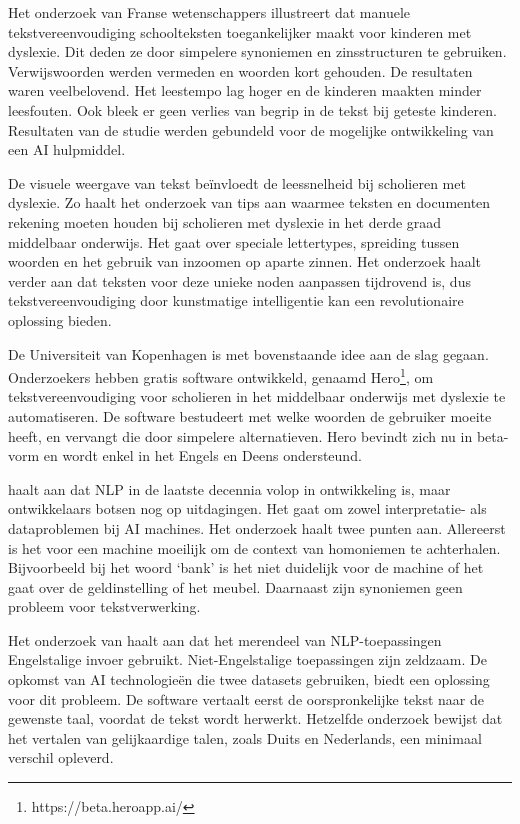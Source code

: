 Het onderzoek van Franse wetenschappers \newline \textcite{Gala2016} illustreert dat manuele tekstvereenvoudiging schoolteksten toegankelijker \newline maakt voor kinderen met dyslexie. Dit deden ze door simpelere synoniemen en zinsstructuren te gebruiken. Verwijswoorden werden vermeden en woorden kort gehouden. De resultaten waren veelbelovend. Het leestempo lag hoger en de kinderen maakten minder leesfouten. Ook bleek er geen verlies van begrip in de tekst bij geteste kinderen. Resultaten van de studie werden gebundeld voor de mogelijke ontwikkeling van een AI hulpmiddel.

De visuele weergave van tekst beïnvloedt de leessnelheid bij scholieren met dyslexie. Zo haalt het onderzoek van \textcite{Rello2012} tips aan waarmee teksten en documenten rekening moeten houden bij scholieren met dyslexie in het derde graad middelbaar onderwijs. Het gaat over speciale lettertypes, spreiding tussen woorden en het gebruik van inzoomen op aparte zinnen. Het onderzoek haalt verder aan dat teksten voor deze unieke noden aanpassen tijdrovend is, dus tekstvereenvoudiging door kunstmatige intelligentie kan een revolutionaire oplossing bieden. 

De Universiteit van Kopenhagen is met bovenstaande idee aan de slag gegaan. Onderzoekers \textcite{Bingel2018} hebben gratis software ontwikkeld, genaamd Hero\footnote{https://beta.heroapp.ai/}, om tekstvereenvoudiging voor scholieren in het middelbaar onderwijs met dyslexie te automatiseren. De software bestudeert met welke woorden de gebruiker moeite heeft, en vervangt die door simpelere alternatieven. Hero bevindt zich nu in beta-vorm en wordt enkel in het Engels en Deens ondersteund. 

\textcite{Roldos2020} haalt aan dat NLP in de laatste decennia volop in ontwikkeling is, maar ontwikkelaars botsen nog op uitdagingen. Het gaat om zowel interpretatie- als dataproblemen bij AI machines. Het onderzoek haalt twee punten aan. Allereerst is het voor een machine moeilijk om de context van homoniemen te achterhalen. Bijvoorbeeld bij het woord ‘bank’ is het niet duidelijk voor de machine of het gaat over de geldinstelling of het meubel. Daarnaast zijn synoniemen geen probleem voor tekstverwerking.

Het onderzoek van \textcite{Sciforce2020} haalt aan dat het merendeel van NLP-toepassingen Engelstalige invoer gebruikt. Niet-Engelstalige toepassingen zijn zeldzaam. De opkomst van AI technologieën die twee datasets gebruiken, biedt een oplossing voor dit probleem. De software vertaalt eerst de oorspronkelijke tekst naar de gewenste taal, voordat de tekst wordt herwerkt. Hetzelfde onderzoek bewijst dat het vertalen van gelijkaardige talen, zoals Duits en Nederlands, een minimaal verschil opleverd.

